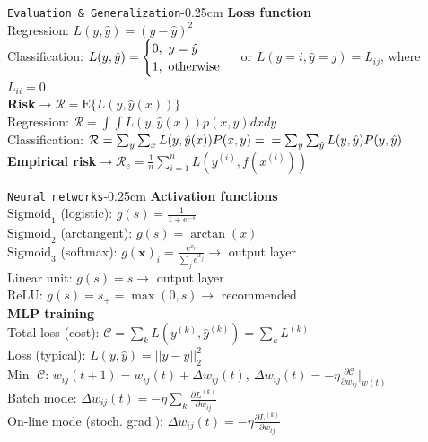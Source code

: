 \documentclass[10pt,3col]{cheatsheet}
\begin{document}
\begin{multicols}{3}
\begin{cheatsheetbox}{\texttt{Evaluation \& Generalization}}{-0.25cm}
    \textbf{Loss function}\\
    Regression: $L(y, \hat{y}) = (y-\hat{y})^2$\\
    Classification: $L(y, \hat{y}) = \begin{cases}0, \ y = \hat{y}\\ 1 , \ \mathrm{otherwise}\end{cases}\\$ or $L(y = i, \hat{y} = j) = L_{ij}$, where $L_{ii} = 0$\\
    \textbf{Risk}$\rightarrow \mathcal{R} = \mathrm{E}\{L(y, \hat{y}(x))\}$\\
    Regression: $\mathcal{R} = \int{\int{L(y, \hat{y}(x)) p(x, y)}}dxdy$\\
    Classification: $\mathcal{R} = \sum_y{\sum_x{L(y, \hat{y}(x)) P(x, y)}} = \\ = \sum_y\sum_{\hat{y}}L(y, \hat{y}) P(y, \hat{y})$\\
    \textbf{Empirical risk}$\rightarrow \mathcal{R}_\mathrm{e} = \frac{1}{n}\sum_{i = 1}^{n} L(y^{(i)}, f(x^{(i)}))$
\end{cheatsheetbox}

\begin{cheatsheetbox}{\texttt{Neural networks}}{-0.25cm}
    \textbf{Activation functions}\\
    $\mathrm{Sigmoid}_1$ (logistic): $g(s) = \frac{1}{1 + e^{-s}}$\\
    $\mathrm{Sigmoid}_2$ (arctangent): $g(s) = \arctan(x)$\\
    $\mathrm{Sigmoid}_3$ (softmax): $g(\mathbf{x})_i = \frac{e^{x_i}}{\sum_j e^{x_j}}\rightarrow$ output layer\\
    Linear unit: $g(s) = s \rightarrow$ output layer\\
    ReLU: $g(s) = s_+ = \max(0, s)\rightarrow$ recommended\\
    \textbf{MLP training}\\
    Total loss (cost): $\mathcal{C} = \sum_k L(y^{(k)}, \hat{y}^{(k)}) = \sum_k L^{(k)}$\\
    Loss (typical): $L(y, \hat{y}) = ||y-\hat{y}||_2^2$\\
    Min. $\mathcal{C}$: {\scriptsize $w_{ij}(t+1) = w_{ij}(t) + \Delta w_{ij}(t), \ \Delta w_{ij}(t) = -\eta \frac{\partial \mathcal{C}}{\partial w_{ij}}\Big|_{w(t)}$}\\
    Batch mode: $\Delta w_{ij}(t) = -\eta \sum_k\frac{\partial L^{(k)}}{\partial w_{ij}}$\\
    On-line mode (stoch. grad.): $\Delta w_{ij}(t) = -\eta \frac{\partial L^{(k)}}{\partial w_{ij}}$
\end{cheatsheetbox}


\end{multicols}
\end{document}
